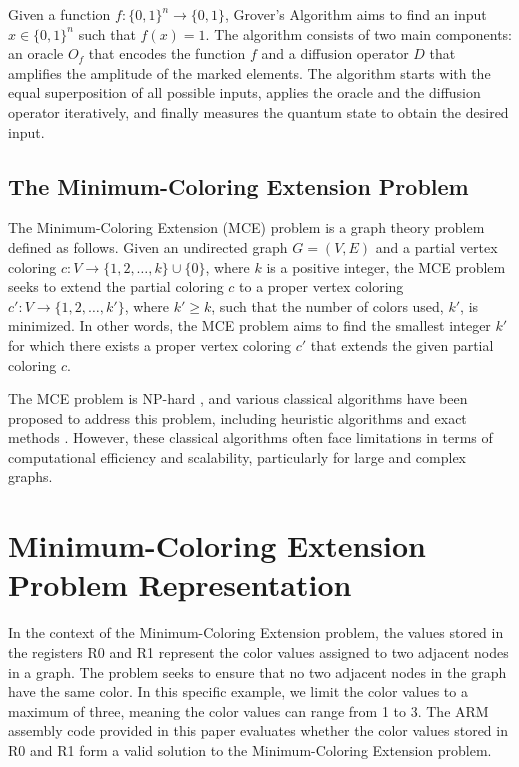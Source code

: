 Given a function $f : \{0, 1\}^n \rightarrow \{0, 1\}$, Grover's Algorithm aims to find an input $x \in \{0, 1\}^n$ such that $f(x) = 1$. The algorithm consists of two main components: an oracle $O_f$ that encodes the function $f$ and a diffusion operator $D$ that amplifies the amplitude of the marked elements. The algorithm starts with the equal superposition of all possible inputs, applies the oracle and the diffusion operator iteratively, and finally measures the quantum state to obtain the desired input.

\subsection{The Minimum-Coloring Extension Problem}
\label{subsec:mce}

The Minimum-Coloring Extension (MCE) problem is a graph theory problem defined as follows. Given an undirected graph $G = (V, E)$ and a partial vertex coloring $c : V \rightarrow \{1, 2, \dots, k\} \cup \{0\}$, where $k$ is a positive integer, the MCE problem seeks to extend the partial coloring $c$ to a proper vertex coloring $c' : V \rightarrow \{1, 2, \dots, k'\}$, where $k' \ge k$, such that the number of colors used, $k'$, is minimized. In other words, the MCE problem aims to find the smallest integer $k'$ for which there exists a proper vertex coloring $c'$ that extends the given partial coloring $c$.

The MCE problem is NP-hard \cite{MCE_np_hard}, and various classical algorithms have been proposed to address this problem, including heuristic algorithms and exact methods \cite{MCE_methods}. However, these classical algorithms often face limitations in terms of computational efficiency and scalability, particularly for large and complex graphs.

\section{Minimum-Coloring Extension Problem Representation}

In the context of the Minimum-Coloring Extension problem, the values stored in the registers R0 and R1 represent the color values assigned to two adjacent nodes in a graph. The problem seeks to ensure that no two adjacent nodes in the graph have the same color. In this specific example, we limit the color values to a maximum of three, meaning the color values can range from 1 to 3. The ARM assembly code provided in this paper evaluates whether the color values stored in R0 and R1 form a valid solution to the Minimum-Coloring Extension problem.

